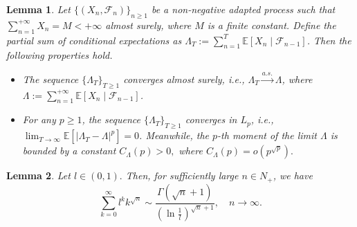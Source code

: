 \documentclass{article} %
\newtheorem{lemma}{Lemma}[section]
\begin{document}
\begin{lemma}\label{lem_important_-1}
Let \(\{(X_n, \mathscr{F}_n)\}_{n \geq 1}\) be a non-negative adapted process such that \(\sum_{n=1}^{+\infty} X_n = M < +\infty\) almost surely, where \(M\) is a finite constant. Define the partial sum of conditional expectations as \(\Lambda_T := \sum_{n=1}^{T} \mathbb{E}[X_n \mid \mathscr{F}_{n-1}]\). Then the following properties hold.
\begin{itemize}
    \item[(i)] The sequence \(\{\Lambda_T\}_{T \geq 1}\) converges almost surely, i.e., \(\Lambda_T \xrightarrow{a.s.} \Lambda\), where \(\Lambda := \sum_{n=1}^{+\infty} \mathbb{E}[X_n \mid \mathscr{F}_{n-1}]\).
    
    \item[(ii)] For any \(p \geq 1\), the sequence \(\{\Lambda_T\}_{T \geq 1}\) converges in \(L_p\), i.e., \(\lim_{T \to \infty} \mathbb{E}\left[|\Lambda_T - \Lambda|^p\right] = 0\). Meanwhile, the \(p\)-th moment of the limit \(\Lambda\) is bounded by a constant \(C_{\Lambda}(p) > 0,\) where \(C_{\Lambda}(p) = o(p^{\sqrt{p}}).\)



\end{itemize}
\end{lemma}
\begin{lemma}\label{esti}
Let \( l \in (0, 1). \) Then, for sufficiently large \( n\in N_{+} \), we have
\[
\sum_{k=0}^{\infty} l^k k^{\sqrt{n}} \sim \frac{\Gamma\left( \sqrt{n} + 1 \right)}{\left( \ln \frac{1}{l} \right)^{\sqrt{n} + 1}}, \quad n \to \infty.
\]
\end{lemma}
\end{document}
